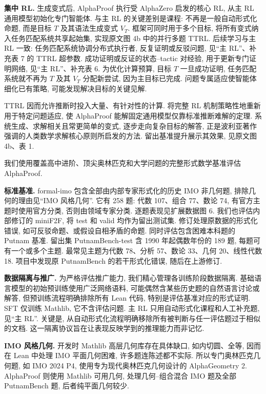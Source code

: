 \noindent\textbf{集中 RL.} 生成变式后, AlphaProof 执行受 AlphaZero 启发的核心 RL, 从主 RL 通用模型初始化专门智能体. 与主 RL 的关键差别是课程: 不再是一般自动形式化命题, 而是目标 $T$ 及其语法生成变式 $V_T$. 框架可同时用于多个目标, 将所有变式纳入任务匹配系统共享起始集, 实现原文图 4b 中的并行多题 TTRL. 后续学习与主 RL 一致: 任务匹配系统协调分布式执行者, 反复证明或反驳问题, 见“主 RL”、补充表 7 的 TTRL 超参数. 成功证明或反证的状态--tactic 对经验, 用于更新专门证明网络, 见“主 RL”、补充表 6. 为优化计算预算, 目标 $T$ 一旦成功证明, 任务匹配系统就不再为 $T$ 及其 $V_T$ 分配新尝试, 因为主目标已完成. 问题专属适应使智能体细化已有策略, 可能发现解决目标的关键见解.

TTRL 因而允许推断时投入大量、有针对性的计算. 将完整 RL 机制策略性地重新用于特定问题适应, 使 AlphaProof 能解固定通用模型仅靠标准推断难解的定理. 系统生成、求解相关且常更简单的变式, 逐步走向复杂目标的解答, 正是波利亚\cite{alphaproof-ref75}著作强调的人类数学求解核心原则所启发的方法. 留出基准提升展示其效果, 见原文图 4b、表 1.

\label{alphaproof-methods-evaluation}
我们使用覆盖高中进阶、顶尖奥林匹克和大学问题的完整形式数学基准评估 AlphaProof.

\noindent\textbf{标准基准.} formal-imo 包含全部由内部专家形式化的历史 IMO 非几何题, 排除几何的理由见“IMO 风格几何”. 它有 258 题: 代数 107、组合 77、数论 74, 有官方主题时使用官方分类, 否则由领域专家分类. 逐题表现见扩展数据图 6. 我们也评估内部修订的 miniF2F\cite{alphaproof-ref20}, 将 test 和 valid 均作为留出测试集. 修订处理原数据的形式化错误, 如可反驳命题、或假设自相矛盾的命题. 同时评估包含困难本科题的 Putnam 基准\cite{alphaproof-ref21}. 留出集 PutnamBench-test 含 1990 年起偶数年份的 189 题, 每题可有一个或多个主题. 最常见主题为代数 78、分析 57、数论 33、几何 20、线性代数 18. 项目中发现原 PutnamBench 的若干形式化错误, 随后在上游修订.

\noindent\textbf{数据隔离与推广.} 为严格评估推广能力, 我们精心管理各训练阶段数据隔离. 基础语言模型的初始预训练使用广泛网络语料, 可能偶然含某些历史题的自然语言讨论或解答, 但预训练流程明确排除所有 Lean 代码, 特别是评估基准对应的形式证明. SFT 仅训练 Mathlib, 它不含评估问题. 主 RL 只用自动形式化课程和人工补充题, 见“主 RL”. 关键是, 从自动形式化流程明确移除所有被判断与任一评估题过于相似的文档. 这一隔离协议旨在让表现反映学到的推理能力而非记忆.

\noindent\textbf{IMO 风格几何.} 开发时 Mathlib 高层几何库存在具体缺口, 如内切圆、全等, 因而在 Lean 中处理 IMO 平面几何困难, 许多题连陈述都不实际. 所以专门奥林匹克几何题, 如 IMO 2024 P4, 使用专为现代奥林匹克几何设计的 AlphaGeometry 2\cite{alphaproof-ref3}. AlphaProof 则使用 Mathlib 可用几何, 处理几何--组合混合 IMO 题及全部 PutnamBench 题, 后者纯平面几何较少.


